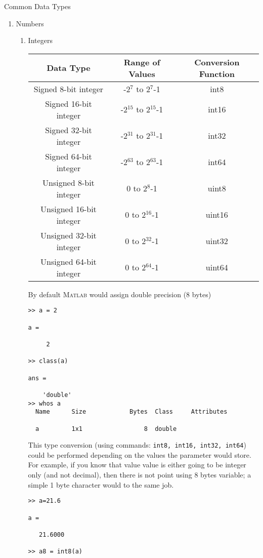 \documentclass[11pt,titlepage,fleqn]{article}
\newcommand{\matlab}{\textsc{Matlab}\xspace}
\begin{document}
\begin{section}{Common Data Types}
\begin{enumerate}
\item Numbers
\begin{enumerate}
\item Integers \\
\begin{tabular}{|c|c|c|}
\hline
Data Type             &  	Range of Values &	Conversion Function\\
\hline
Signed 8-bit integer  & 	-2$^7$ to 2$^7$-1 &	int8\\
Signed 16-bit integer &	-2$^{15}$ to 2$^{15}$-1 &	int16\\
Signed 32-bit integer &	-2$^{31}$ to 2$^{31}$-1 &	int32\\
Signed 64-bit integer &	-2$^{63}$ to 2$^{63}$-1 &	int64\\
Unsigned 8-bit integer  &	0 to 2$^{8}$-1  &	uint8\\
Unsigned 16-bit integer &	0 to 2$^{16}$-1 &	uint16\\
Unsigned 32-bit integer	& 0 to 2$^{32}$-1 &	uint32\\
Unsigned 64-bit integer	& 0 to 2$^{64}$-1 &	uint64\\
\hline
\end{tabular}

By default \matlab would assign double precision (8 bytes)
\begin{verbatim}
>> a = 2

a =

     2

>> class(a)

ans =

    'double'
>> whos a
  Name      Size            Bytes  Class     Attributes

  a         1x1                 8  double  

\end{verbatim}

This type conversion (using commands: \verb+int8, int16, int32, int64+) could be performed depending on the values the parameter would store. For example, if you know that value value is either going to be integer only (and not decimal), then there is not point using 8 bytes variable; a simple 1 byte character would to the same job.
\begin{verbatim}
>> a=21.6

a =

   21.6000

>> a8 = int8(a)


\end{verbatim}
\end{enumerate}
\end{enumerate}
\end{section}
\end{document}
